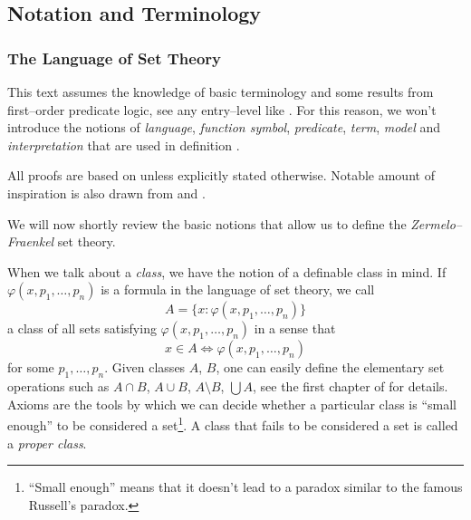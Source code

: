 \subsection{Notation and Terminology}
\subsubsection{The Language of Set Theory}
This text assumes the knowledge of basic terminology and some results from first–order predicate logic, see any entry–level like \cite{hamiltonBook}. For this reason, we won't introduce the notions of \emph{language}, \emph{function symbol}, \emph{predicate}, \emph{term}, \emph{model} and \emph{interpretation} that are used in definition .


All proofs are based on \cite{JechBook} unless explicitly stated otherwise. Notable amount of inspiration is also drawn from \cite{KanamoriBook} and \cite{DrakeBook}.

We will now shortly review the basic notions that allow us to define the \emph{Zermelo–Fraenkel} set theory.



When we talk about a \emph{class}, we have the notion of a definable class in mind. 
If $\varphi(x, p_1, \ldots, p_n)$ is a formula in the language of set theory, we call 
\begin{equation}
A = \{x : \varphi(x, p_1, \ldots, p_n)\}
\end{equation}
a class of all sets satisfying $\varphi(x, p_1, \ldots, p_n)$ in a sense that 
\begin{equation}
x \in A \iff \varphi(x, p_1, \ldots, p_n)
\end{equation}
for some $p_1, \ldots, p_n$. Given classes $A$, $B$, one can easily define the elementary set operations such as $A \cap B$, $A \cup B$, $A \setminus B$, $\bigcup A$, see the first chapter of \cite{JechBook} for details.
Axioms are the tools by which we can decide whether a particular class is ``small enough'' to be considered a set\footnote{``Small enough'' means that it doesn't lead to a paradox similar to the famous Russell's paradox.}. A class that fails to be considered a set is called a \emph{proper class}.

